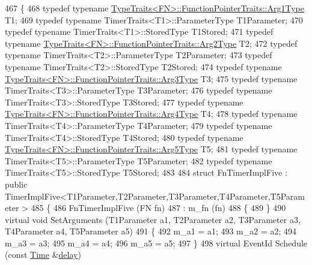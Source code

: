 \begin{DoxyCode}
467 \{
468   \textcolor{keyword}{typedef} \textcolor{keyword}{typename} \hyperlink{structTypeTraits}{TypeTraits<FN>::FunctionPointerTraits::Arg1Type}
       T1;
469   \textcolor{keyword}{typedef} \textcolor{keyword}{typename} TimerTraits<T1>::ParameterType T1Parameter;
470   \textcolor{keyword}{typedef} \textcolor{keyword}{typename} TimerTraits<T1>::StoredType T1Stored;
471   \textcolor{keyword}{typedef} \textcolor{keyword}{typename} \hyperlink{structTypeTraits}{TypeTraits<FN>::FunctionPointerTraits::Arg2Type}
       T2;
472   \textcolor{keyword}{typedef} \textcolor{keyword}{typename} TimerTraits<T2>::ParameterType T2Parameter;
473   \textcolor{keyword}{typedef} \textcolor{keyword}{typename} TimerTraits<T2>::StoredType T2Stored;
474   \textcolor{keyword}{typedef} \textcolor{keyword}{typename} \hyperlink{structTypeTraits}{TypeTraits<FN>::FunctionPointerTraits::Arg3Type}
       T3;
475   \textcolor{keyword}{typedef} \textcolor{keyword}{typename} TimerTraits<T3>::ParameterType T3Parameter;
476   \textcolor{keyword}{typedef} \textcolor{keyword}{typename} TimerTraits<T3>::StoredType T3Stored;
477   \textcolor{keyword}{typedef} \textcolor{keyword}{typename} \hyperlink{structTypeTraits}{TypeTraits<FN>::FunctionPointerTraits::Arg4Type}
       T4;
478   \textcolor{keyword}{typedef} \textcolor{keyword}{typename} TimerTraits<T4>::ParameterType T4Parameter;
479   \textcolor{keyword}{typedef} \textcolor{keyword}{typename} TimerTraits<T4>::StoredType T4Stored;
480   \textcolor{keyword}{typedef} \textcolor{keyword}{typename} \hyperlink{structTypeTraits}{TypeTraits<FN>::FunctionPointerTraits::Arg5Type}
       T5;
481   \textcolor{keyword}{typedef} \textcolor{keyword}{typename} TimerTraits<T5>::ParameterType T5Parameter;
482   \textcolor{keyword}{typedef} \textcolor{keyword}{typename} TimerTraits<T5>::StoredType T5Stored;
483 
484   \textcolor{keyword}{struct }FnTimerImplFive : \textcolor{keyword}{public} TimerImplFive<T1Parameter,T2Parameter,T3Parameter,T4Parameter,T5Parameter
      >
485   \{
486     FnTimerImplFive (FN fn)
487       : m\_fn (fn)
488     \{
489     \}
490     \textcolor{keyword}{virtual} \textcolor{keywordtype}{void} SetArguments (T1Parameter a1, T2Parameter a2, T3Parameter a3, T4Parameter a4, T5Parameter 
      a5)
491     \{
492       m\_a1 = a1;
493       m\_a2 = a2;
494       m\_a3 = a3;
495       m\_a4 = a4;
496       m\_a5 = a5;
497     \}
498     \textcolor{keyword}{virtual} EventId Schedule (\textcolor{keyword}{const} \hyperlink{namespacens3_1_1TracedValueCallback_a7ffd3e7c142ffe7c8a1d2db9b8de38ec}{Time} &\hyperlink{lte_2model_2fading-traces_2fading__trace__generator_8m_a7964e6aa8f61a9d28973c8267a606ad8}{delay})

\end{DoxyCode}
